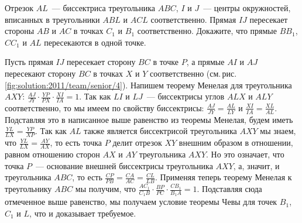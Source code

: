 \problem
{}
Отрезок $AL$~--- биссектриса треугольника $ABC$, $I$ и $J$~--- центры
окружностей, вписанных в треугольники $ABL$ и $ACL$ соответственно.
Прямая $IJ$ пересекает стороны $AB$ и $AC$ в точках $C_1$ и $B_1$
соответственно.
Докажите, что прямые $B B_1$, $C C_1$ и $AL$ пересекаются в одной точке.

%
\label{solution:2011/team/senior/4}%
Пусть прямая $IJ$ пересекает сторону $BC$ в точке $P$, а прямые $AI$ и $AJ$
пересекают сторону $BC$ в точках $X$ и $Y$ соответственно
(см.\,рис.\,\ref{fig:solution:2011/team/senior/4}).
Напишем теорему Менелая для треугольника $AXY$:
\(
    \frac{AJ}{JY}
    \cdot
    \frac{YP}{PX}
    \cdot
    \frac{XI}{IA}
=
    1
\).
Так как $LI$ и $LJ$~--- биссектрисы углов $ALX$ и $ALY$ соответственно, то мы
имеем по свойству биссектрисы:
$\frac{AJ}{JY} = \frac{AL}{LY}$ и $\frac{XI}{IA} = \frac{XL}{AL}$.
Подставляя это в написанное выше равенство из теоремы Менелая, будем иметь
$\frac{YL}{LX} = \frac{YP}{XP}$.
Так как $AL$ также является биссектрисой треугольника $AXY$ мы знаем, что
$\frac{YL}{LX} = \frac{AY}{AX}$, то есть точка $P$ делит отрезок $XY$ внешним
образом в отношении, равном отношению сторон $AX$ и $AY$ треугольника $AXY$.
Но это означает, что точка $P$~--- основание внешней биссектрисы треугольника
$AXY$, а, значит, и треугольника $ABC$, то есть
$\frac{CP}{PB} = \frac{CA}{AC} = \frac{CL}{LB}$.
Применяя теперь теорему Менелая к треугольнику $ABC$ мы получим, что
\(
    \frac{A C_1}{C_1 B}
    \cdot
    \frac{BP}{PC}
    \cdot
    \frac{C B_1}{B_1 A}
=
    1
\).
Подставляя сюда отмеченное выше равенство, мы получаем условие теоремы Чевы для
точек $B_1$, $C_1$ и $L$, что и доказывает требуемое.

\endproblem
